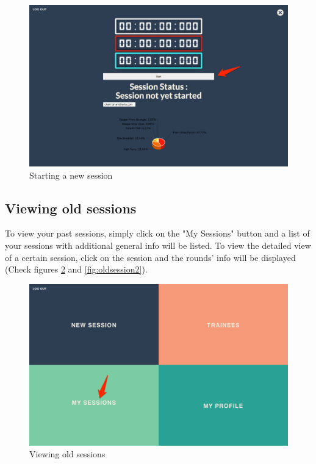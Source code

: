 \begin{figure}[htbp]
\centering 
\includegraphics[width=1.0\linewidth]{steps/NewSession3} 
\caption{Starting a new session} 
\label{fig:newsession3} 
\end{figure} 

\subsection{Viewing old sessions}
To view your past sessions, simply click on the "My Sessions" button and a list of your sessions with additional general info will be listed. To view the detailed view of a certain session, click on the session and the rounds' info will be displayed (Check figures \ref{fig:oldsessions} and \ref{fig:oldsession2}).

\begin{figure}[htbp]
\centering 
\includegraphics[width=1.0\linewidth]{steps/MySessions} 
\caption{Viewing old sessions} 
\label{fig:oldsessions} 
\end{figure} 

